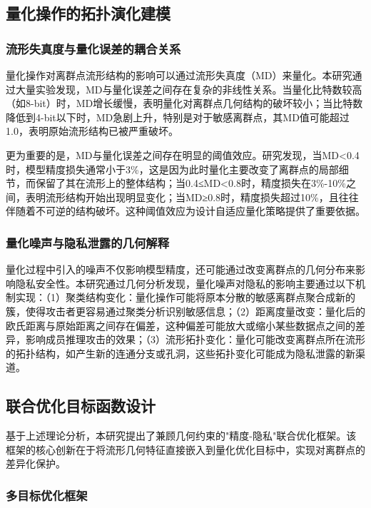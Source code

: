 \subsection{量化操作的拓扑演化建模}

\subsubsection{流形失真度与量化误差的耦合关系}

量化操作对离群点流形结构的影响可以通过流形失真度（MD）来量化。本研究通过大量实验发现，MD与量化误差之间存在复杂的非线性关系。当量化比特数较高（如8-bit）时，MD增长缓慢，表明量化对离群点几何结构的破坏较小；当比特数降低到4-bit以下时，MD急剧上升，特别是对于敏感离群点，其MD值可能超过1.0，表明原始流形结构已被严重破坏。

更为重要的是，MD与量化误差之间存在明显的阈值效应。研究发现，当MD<0.4时，模型精度损失通常小于3\%，这是因为此时量化主要改变了离群点的局部细节，而保留了其在流形上的整体结构；当0.4≤MD<0.8时，精度损失在3\%-10\%之间，表明流形结构开始出现明显变化；当MD≥0.8时，精度损失超过10\%，且往往伴随着不可逆的结构破坏。这种阈值效应为设计自适应量化策略提供了重要依据。

\subsubsection{量化噪声与隐私泄露的几何解释}

量化过程中引入的噪声不仅影响模型精度，还可能通过改变离群点的几何分布来影响隐私安全性。本研究通过几何分析发现，量化噪声对隐私的影响主要通过以下机制实现：（1）聚类结构变化：量化操作可能将原本分散的敏感离群点聚合成新的簇，使得攻击者更容易通过聚类分析识别敏感信息；（2）距离度量改变：量化后的欧氏距离与原始距离之间存在偏差，这种偏差可能放大或缩小某些数据点之间的差异，影响成员推理攻击的效果；（3）流形拓扑变化：量化可能改变离群点所在流形的拓扑结构，如产生新的连通分支或孔洞，这些拓扑变化可能成为隐私泄露的新渠道。

\subsection{联合优化目标函数设计}

基于上述理论分析，本研究提出了兼顾几何约束的"精度-隐私"联合优化框架。该框架的核心创新在于将流形几何特征直接嵌入到量化优化目标中，实现对离群点的差异化保护。

\subsubsection{多目标优化框架}

